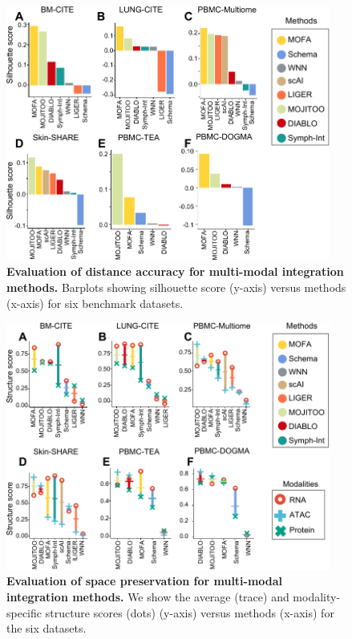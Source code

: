 \begin{figure}[!ht]
	\centering
	\includegraphics[width=0.95\textwidth]{silouette/fig}
	\vspace{0.1cm}
	\caption[Evaluation of distance accuracy for multi-modal integration methods.]{
        \textbf{Evaluation of distance accuracy for multi-modal integration methods.} Barplots showing silhouette score (y-axis) versus methods (x-axis) for six benchmark datasets. }
	\label{fig:silouette}
\end{figure}


\begin{figure}[!ht]
	\centering
	\includegraphics[width=0.95\textwidth]{structure/fig}
	\vspace{0.1cm}
	\caption[Evaluation of space preservation for multi-modal integration methods.]{
	\textbf{Evaluation of space preservation for multi-modal integration methods.}  We show the average (trace) and modality-specific structure scores (dots) (y-axis) versus methods (x-axis) for the six datasets.}
	\label{fig:structure}
\end{figure}

